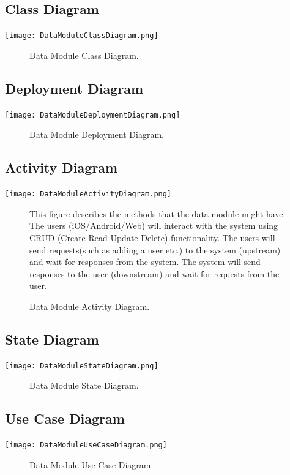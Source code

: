 \documentclass[12pt]{article}
\begin{document}
	\subsection{Class Diagram}
        \texttt{[image: DataModuleClassDiagram.png]}
        \begin{figure}[h]
            \caption{Data Module Class Diagram.}
        \end{figure}
    
    \subsection{Deployment Diagram}
        \texttt{[image: DataModuleDeploymentDiagram.png]}
        \begin{figure}[h]
            \caption{Data Module Deployment Diagram.}
        \end{figure}
        
    \subsection{Activity Diagram}
        \texttt{[image: DataModuleActivityDiagram.png]}
        \begin{figure}[h]
            \caption{Data Module Activity Diagram.}
	    This figure describes the methods that the data module might have. The users (iOS/Android/Web) will interact with the system using CRUD (Create Read Update Delete) functionality. The users will send requests(such as adding a user etc.) to the system (upstream) and wait for responses from the system. The system will send responses to the user (downstream) and wait for requests from the user.
        \end{figure}
	
	\subsection{State Diagram}
       \texttt{[image: DataModuleStateDiagram.png]}
        \begin{figure}[h]
        	\caption{Data Module State Diagram.}
        \end{figure}
	
	\subsection{Use Case Diagram}
        	\texttt{[image: DataModuleUseCaseDiagram.png]}
        	\begin{figure}[h]
        		\caption{Data Module Use Case Diagram.}
        	\end{figure}
	
\end{document}
